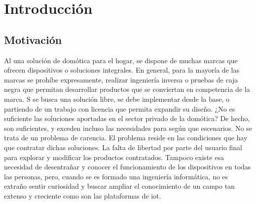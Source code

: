 \cleardoublepage

\chapter{Introducción}

\section{Motivación}
\label{ch:Capitulo1}

Al una solución de domótica para el hogar, se dispone de muchas marcas que ofrecen dispositivos o soluciones integrales. En general, para la mayoría de las marcas se prohíbe expresamente, realizar ingeniería inversa o pruebas de caja negra que permitan desarrollar productos que se conviertan en competencia de la marca. S se busca una solución libre, se debe implementar desde la base, o partiendo de un trabajo con licencia que permita expandir su diseño. ¿No es suficiente las soluciones aportadas en el sector privado de la domótica? De hecho, son suficientes, y exceden incluso las necesidades para según que escenarios. No se trata de un problema de carencia. El problema reside en las condiciones que hay que contratar dichas soluciones. La falta de libertad por parte del usuario final para explorar y modificar los productos contratados. Tampoco existe esa necesidad de desentrañar y conocer el funcionamiento de los dispositivos en todas las personas, pero, cuando se es formado una ingeniería informática, no es extraño sentir curiosidad y buscar ampliar el conocimiento de un campo tan extenso y creciente como son las plataformas de \gls{iot}.

\vspace{1cm}


